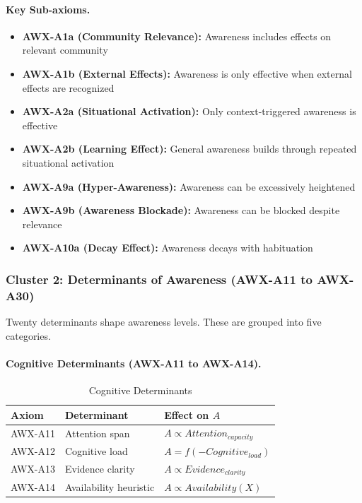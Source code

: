 \paragraph{Key Sub-axioms.}
\begin{itemize}
\item \textbf{AWX-A1a (Community Relevance):} Awareness includes effects on relevant community
\item \textbf{AWX-A1b (External Effects):} Awareness is only effective when external effects are recognized
\item \textbf{AWX-A2a (Situational Activation):} Only context-triggered awareness is effective
\item \textbf{AWX-A2b (Learning Effect):} General awareness builds through repeated situational activation
\item \textbf{AWX-A9a (Hyper-Awareness):} Awareness can be excessively heightened
\item \textbf{AWX-A9b (Awareness Blockade):} Awareness can be blocked despite relevance
\item \textbf{AWX-A10a (Decay Effect):} Awareness decays with habituation
\end{itemize}

\subsubsection{Cluster 2: Determinants of Awareness (AWX-A11 to AWX-A30)}

Twenty determinants shape awareness levels. These are grouped into five categories.

\paragraph{Cognitive Determinants (AWX-A11 to AWX-A14).}

\begin{table}[htbp]
\centering
\caption{Cognitive Determinants}
\label{tab:cognitive-determinants}
\renewcommand{\arraystretch}{1.3}
\begin{tabular}{@{}lll@{}}
\toprule
\textbf{Axiom} & \textbf{Determinant} & \textbf{Effect on $A$} \\
\midrule
AWX-A11 & Attention span & $A \propto Attention_{capacity}$ \\
AWX-A12 & Cognitive load & $A = f(-Cognitive_{load})$ \\
AWX-A13 & Evidence clarity & $A \propto Evidence_{clarity}$ \\
AWX-A14 & Availability heuristic & $A \propto Availability(X)$ \\
\bottomrule
\end{tabular}
\end{table}


